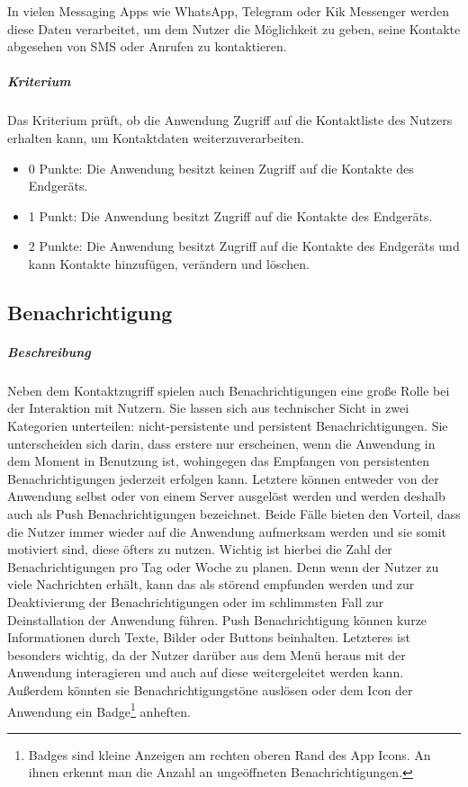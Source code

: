 In vielen Messaging Apps wie WhatsApp, Telegram oder Kik Messenger werden diese Daten verarbeitet, um dem Nutzer die Möglichkeit zu geben, seine Kontakte abgesehen von SMS oder Anrufen zu kontaktieren.

\subparagraph{Kriterium\\}
Das Kriterium prüft, ob die Anwendung Zugriff auf die Kontaktliste des Nutzers erhalten kann, um Kontaktdaten weiterzuverarbeiten.

\begin{itemize}
\item 0 Punkte: Die Anwendung besitzt keinen Zugriff auf die Kontakte des Endgeräts.
\item 1 Punkt: Die Anwendung besitzt Zugriff auf die Kontakte des Endgeräts.
\item 2 Punkte: Die Anwendung besitzt Zugriff auf die Kontakte des Endgeräts und kann Kontakte hinzufügen, verändern und löschen.
\end{itemize}

\subsection{Benachrichtigung}
\subparagraph{Beschreibung\\}
Neben dem Kontaktzugriff spielen auch Benachrichtigungen eine große Rolle bei der Interaktion mit Nutzern.
Sie lassen sich aus technischer Sicht in zwei Kategorien unterteilen: nicht-persistente und persistent Benachrichtigungen.
Sie unterscheiden sich darin, dass erstere nur erscheinen, wenn die Anwendung in dem Moment in Benutzung ist, wohingegen das Empfangen von persistenten Benachrichtigungen jederzeit erfolgen kann.
Letztere können entweder von der Anwendung selbst oder von einem Server ausgelöst werden und werden deshalb auch als Push Benachrichtigungen bezeichnet.
Beide Fälle bieten den Vorteil, dass die Nutzer immer wieder auf die Anwendung aufmerksam werden und sie somit motiviert sind, diese öfters zu nutzen.
Wichtig ist hierbei die Zahl der Benachrichtigungen pro Tag oder Woche zu planen.
Denn wenn der Nutzer zu viele Nachrichten erhält, kann das als störend empfunden werden und zur Deaktivierung der Benachrichtigungen oder im schlimmsten Fall zur Deinstallation der Anwendung führen.
Push Benachrichtigung können kurze Informationen durch Texte, Bilder oder Buttons beinhalten.
Letzteres ist besonders wichtig, da der Nutzer darüber aus dem Menü heraus mit der Anwendung interagieren und auch auf diese weitergeleitet werden kann.
Außerdem könnten sie Benachrichtigungstöne auslösen oder dem Icon der Anwendung ein Badge\footnote{Badges sind kleine Anzeigen am rechten oberen Rand des App Icons. An ihnen erkennt man die Anzahl an ungeöffneten Benachrichtigungen.} anheften.


